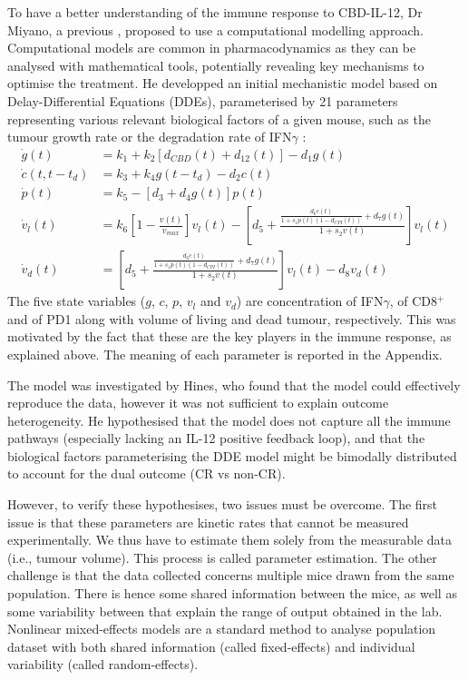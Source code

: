 \documentclass[11pt]{article}
\begin{document}
To have a better understanding of the immune response to CBD-IL-12, Dr Miyano, a previous  \cite{takuya}, proposed to use a computational modelling approach. Computational models are common in pharmacodynamics as they can be analysed with mathematical tools, potentially revealing key mechanisms to optimise the treatment. He developped an initial mechanistic model based on Delay-Differential Equations (DDEs), parameterised by 21 parameters representing various relevant biological factors of a given mouse, such as the tumour growth rate or the degradation rate of IFN$\gamma$ \cite{takuya}: 
\begin{align*}
    \dot{g}(t) &= k_1 + k_2 [d_{CBD}(t) + d_{12}(t)] - d_1g(t) \\ 
    \dot{c}(t,t-t_d) &= k_3 + k_4g(t-t_d)-d_2c(t) \\ 
    \dot{p}(t) &= k_5 - [d_3 + d_4g(t)]p(t) \\ 
    \dot{v}_l(t) &= k_6\left[1 - \frac{v(t)}{v_{max}} \right]v_l(t) - \left[d_5 + \frac{\frac{d_6c(t)}{1+s_1p(t)(1-d_{CPI}(t))}+d_7g(t)}{1+s_2v(t)}\right]v_l(t)\\
    \dot{v}_d(t) &= \left[d_5 + \frac{\frac{d_6c(t)}{1+s_1p(t)(1-d_{CPI}(t))}+d_7g(t)}{1+s_2v(t)}\right]v_l(t) - d_8 v_d(t)
\end{align*}
The five state variables ($g$, $c$, $p$, $v_l$ and $v_d$) are concentration of IFN$\gamma$, of CD8$^+$ and of PD1 along with volume of living and dead tumour, respectively. This was motivated by the fact that these are the key players in the immune response, as explained above. The meaning of each parameter is reported in the Appendix.

The model was investigated by Hines, who found that the model could effectively reproduce the data, however it was not sufficient to explain outcome heterogeneity. He hypothesised that the model does not capture all the immune pathways (especially lacking an IL-12 positive feedback loop), and that the biological factors parameterising the DDE model might be bimodally distributed to account for the dual outcome (CR vs non-CR). 

However, to verify these hypothesises, two issues must be overcome. The first issue is that these parameters are kinetic rates that cannot be measured experimentally. We thus have to estimate them solely from the measurable data (i.e., tumour volume). This process is called parameter estimation. The other challenge is that the data collected concerns multiple mice drawn from the same population. There is hence some shared information between the mice, as well as some variability between that explain the range of output obtained in the lab. Nonlinear mixed-effects models \cite{Davidian2011} are a standard method to analyse population dataset with both shared information (called fixed-effects) and individual variability (called random-effects).
\end{document}
